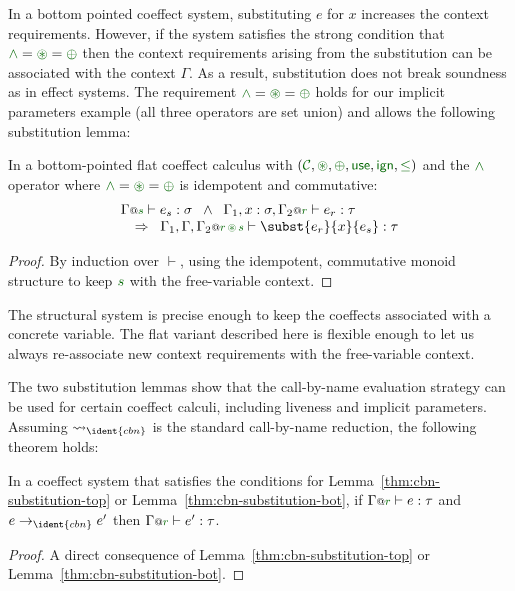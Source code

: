 In a bottom pointed coeffect system, substituting $e$ for $x$ increases the context 
requirements. However, if the system satisfies the strong condition that $\cclrd{\wedge} = \cseq = \cpar$ then
the context requirements arising from the substitution can be associated with the context
$\Gamma$. As a result, substitution does not break soundness as in effect systems. The 
requirement $\cclrd{\wedge} = \cseq = \cpar$ holds for our implicit parameters example 
(all three operators are set union) and allows the following substitution lemma:

\begin{lemma}
\label{thm:cbn-substitution-bot}
In a bottom-pointed flat coeffect calculus with $(\C, \cseq, \cpar, \cunit, \czero, \cleq)$ 
and the $\cclrd{\wedge}$ operator where $\cclrd{\wedge} = \cseq = \cpar$ is idempotent and commutative:
\[
\begin{array}{l}
\coctx{\Gamma}{\cclrd{s}} \vdash e_s : \sigma \;\; \wedge \;\; \coctx{\Gamma_1,  x : \sigma, \Gamma_2}{ \cclrd{r}  } \vdash e_r : \tau\\
\quad \Rightarrow \;\; \coctx{\Gamma_1,\Gamma,\Gamma_2}{ \cclrd{r} \,\cseq\, \cclrd{s} } \vdash \subst{e_r}{x}{e_s} : \tau
\end{array}
\]
\vspace{-1.5em}
\end{lemma}
\begin{proof}
By induction over $\vdash$, using the idempotent, commutative monoid structure to keep $\cclrd{s}$ with
the free-variable context.
\end{proof}
\noindent
The structural system is precise enough to keep the coeffects associated with a concrete variable. The flat
variant described here is flexible enough to let us always re-associate new context requirements with the 
free-variable context.

The two substitution lemmas show that the call-by-name evaluation strategy can be used for
certain coeffect calculi, including liveness and implicit parameters.
Assuming $\reduce_{\ident{cbn}}$ is the standard call-by-name
reduction, the following theorem holds:

\begin{theorem}
\raggedright
In a coeffect system that satisfies the conditions for Lemma~\ref{thm:cbn-substitution-top} or
Lemma~\ref{thm:cbn-substitution-bot}, if $\coctx{\Gamma}{\cclrd{r}} \vdash e : \tau$ 
and $e \rightarrow_{\ident{cbn}} e'$ then $\coctx{\Gamma}{\cclrd{r}} \vdash e' : \tau$.
\end{theorem}
\begin{proof}
A direct consequence of Lemma~\ref{thm:cbn-substitution-top} or Lemma~\ref{thm:cbn-substitution-bot}.
\end{proof}

